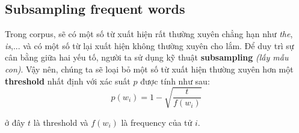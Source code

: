 \documentclass[12pt]{article}
\newcommand{\twiceIndent}{\hspace{\parindent}}
\begin{document}
\subsection{Subsampling frequent words}
Trong corpus, sẽ có một số từ xuất hiện rất thường xuyên chẳng hạn như \textsl{the}, \textsl{is},... và có một số từ lại xuất hiện không thường xuyên cho lắm. Để duy trì sự cân bằng giữa hai yếu tố, người ta sử dụng kỹ thuật \textbf{subsampling} \textit{(lấy mẫu con)}. Vậy nên, chúng ta sẽ loại bỏ một số từ xuất hiện thường xuyên hơn một \textbf{threshold} nhất định với xác suất $p$ được tính như sau:
$$p(w_i) = 1 - \sqrt{\dfrac{t}{f(w_i)}}$$

\twiceIndent ở đây $t$ là threshold và $f(w_i)$ là frequency của tử $i$.
\end{document}
